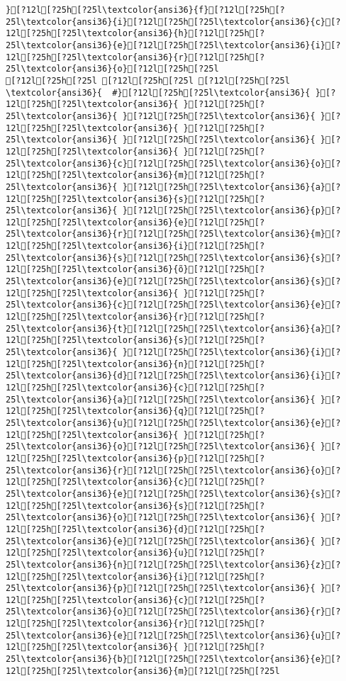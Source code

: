 \documentclass{scrartcl}
\begin{document}
\begin{Verbatim}
}[?12l[?25h[?25l\textcolor{ansi36}{f}[?12l[?25h[?25l\textcolor{ansi36}{i}[?12l[?25h[?25l\textcolor{ansi36}{c}[?12l[?25h[?25l\textcolor{ansi36}{h}[?12l[?25h[?25l\textcolor{ansi36}{e}[?12l[?25h[?25l\textcolor{ansi36}{i}[?12l[?25h[?25l\textcolor{ansi36}{r}[?12l[?25h[?25l\textcolor{ansi36}{o}[?12l[?25h[?25l
[?12l[?25h[?25l [?12l[?25h[?25l [?12l[?25h[?25l
\textcolor{ansi36}{  #}[?12l[?25h[?25l\textcolor{ansi36}{ }[?12l[?25h[?25l\textcolor{ansi36}{ }[?12l[?25h[?25l\textcolor{ansi36}{ }[?12l[?25h[?25l\textcolor{ansi36}{ }[?12l[?25h[?25l\textcolor{ansi36}{ }[?12l[?25h[?25l\textcolor{ansi36}{ }[?12l[?25h[?25l\textcolor{ansi36}{ }[?12l[?25h[?25l\textcolor{ansi36}{ }[?12l[?25h[?25l\textcolor{ansi36}{c}[?12l[?25h[?25l\textcolor{ansi36}{o}[?12l[?25h[?25l\textcolor{ansi36}{m}[?12l[?25h[?25l\textcolor{ansi36}{ }[?12l[?25h[?25l\textcolor{ansi36}{a}[?12l[?25h[?25l\textcolor{ansi36}{s}[?12l[?25h[?25l\textcolor{ansi36}{ }[?12l[?25h[?25l\textcolor{ansi36}{p}[?12l[?25h[?25l\textcolor{ansi36}{e}[?12l[?25h[?25l\textcolor{ansi36}{r}[?12l[?25h[?25l\textcolor{ansi36}{m}[?12l[?25h[?25l\textcolor{ansi36}{i}[?12l[?25h[?25l\textcolor{ansi36}{s}[?12l[?25h[?25l\textcolor{ansi36}{s}[?12l[?25h[?25l\textcolor{ansi36}{õ}[?12l[?25h[?25l\textcolor{ansi36}{e}[?12l[?25h[?25l\textcolor{ansi36}{s}[?12l[?25h[?25l\textcolor{ansi36}{ }[?12l[?25h[?25l\textcolor{ansi36}{c}[?12l[?25h[?25l\textcolor{ansi36}{e}[?12l[?25h[?25l\textcolor{ansi36}{r}[?12l[?25h[?25l\textcolor{ansi36}{t}[?12l[?25h[?25l\textcolor{ansi36}{a}[?12l[?25h[?25l\textcolor{ansi36}{s}[?12l[?25h[?25l\textcolor{ansi36}{ }[?12l[?25h[?25l\textcolor{ansi36}{i}[?12l[?25h[?25l\textcolor{ansi36}{n}[?12l[?25h[?25l\textcolor{ansi36}{d}[?12l[?25h[?25l\textcolor{ansi36}{i}[?12l[?25h[?25l\textcolor{ansi36}{c}[?12l[?25h[?25l\textcolor{ansi36}{a}[?12l[?25h[?25l\textcolor{ansi36}{ }[?12l[?25h[?25l\textcolor{ansi36}{q}[?12l[?25h[?25l\textcolor{ansi36}{u}[?12l[?25h[?25l\textcolor{ansi36}{e}[?12l[?25h[?25l\textcolor{ansi36}{ }[?12l[?25h[?25l\textcolor{ansi36}{o}[?12l[?25h[?25l\textcolor{ansi36}{ }[?12l[?25h[?25l\textcolor{ansi36}{p}[?12l[?25h[?25l\textcolor{ansi36}{r}[?12l[?25h[?25l\textcolor{ansi36}{o}[?12l[?25h[?25l\textcolor{ansi36}{c}[?12l[?25h[?25l\textcolor{ansi36}{e}[?12l[?25h[?25l\textcolor{ansi36}{s}[?12l[?25h[?25l\textcolor{ansi36}{s}[?12l[?25h[?25l\textcolor{ansi36}{o}[?12l[?25h[?25l\textcolor{ansi36}{ }[?12l[?25h[?25l\textcolor{ansi36}{d}[?12l[?25h[?25l\textcolor{ansi36}{e}[?12l[?25h[?25l\textcolor{ansi36}{ }[?12l[?25h[?25l\textcolor{ansi36}{u}[?12l[?25h[?25l\textcolor{ansi36}{n}[?12l[?25h[?25l\textcolor{ansi36}{z}[?12l[?25h[?25l\textcolor{ansi36}{i}[?12l[?25h[?25l\textcolor{ansi36}{p}[?12l[?25h[?25l\textcolor{ansi36}{ }[?12l[?25h[?25l\textcolor{ansi36}{c}[?12l[?25h[?25l\textcolor{ansi36}{o}[?12l[?25h[?25l\textcolor{ansi36}{r}[?12l[?25h[?25l\textcolor{ansi36}{r}[?12l[?25h[?25l\textcolor{ansi36}{e}[?12l[?25h[?25l\textcolor{ansi36}{u}[?12l[?25h[?25l\textcolor{ansi36}{ }[?12l[?25h[?25l\textcolor{ansi36}{b}[?12l[?25h[?25l\textcolor{ansi36}{e}[?12l[?25h[?25l\textcolor{ansi36}{m}[?12l[?25h[?25l

\end{Verbatim}
\end{document}
